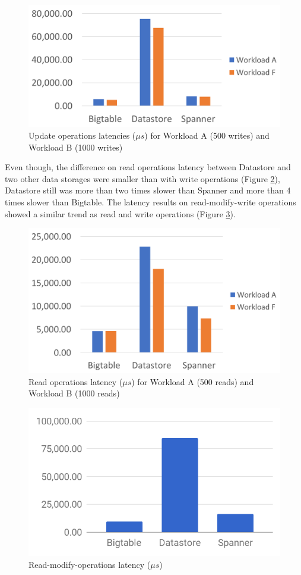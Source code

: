 \documentclass[bsc,frontabs,twoside,singlespacing,parskip,deptreport]{infthesis}     %
\begin{document}
\begin{figure}[H]
	\centering
	\includegraphics[width=12cm]{write-latency}
 	\caption{Update operations latencies (\( \mu s\)) for Workload A (500 writes) and Workload B (1000 writes)}
	\label{write-latency}
\end{figure}

Even though, the difference on read operations latency between Datastore and two other data storages were smaller than with write operations (Figure \ref{read-latency}), Datastore still was more than two times slower than Spanner and more than 4 times slower than Bigtable. The latency results on read-modify-write operations showed a similar trend as read and write operations (Figure \ref{read-modify-write-latency}). 

\begin{figure}[H]
	\centering
	\includegraphics[width=12cm]{read-latency}
	\caption{Read operations latency (\( \mu s\)) for Workload A (500 reads) and Workload B (1000 reads)}
	\label{read-latency}
\end{figure}

\begin{figure}[H]
	\centering
	\includegraphics[width=12cm]{read-modify-write-latency}
	\caption{Read-modify-operations latency (\( \mu s\))}
	\label{read-modify-write-latency}
\end{figure}
\end{document}
